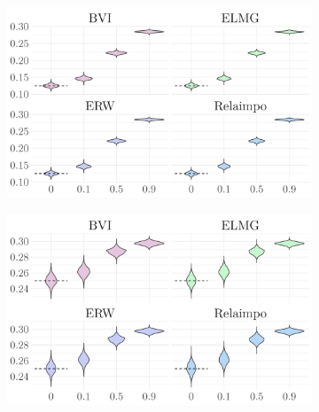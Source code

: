 \begin{figure}[H]
  \centering
  \begin{subfigure}[b]{0.7\linewidth}
    \centering
    \includegraphics[width=\linewidth]{Figures/ViolinPlots/Variance_V1.png}
    \label{fig:relimp_X1_fig}
  \end{subfigure}
  
  \begin{subfigure}[b]{0.7\linewidth}
    \centering
    \includegraphics[width=\linewidth]{Figures/ViolinPlots/Variance_V2.png}
    \label{fig:relimp_X2_fig}
  \end{subfigure}
  

\end{figure}
